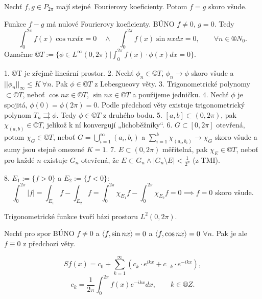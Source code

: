 \documentclass[12pt]{article}					%
\begin{document}
	\begin{veta}
		Nechť $f, g \in P_{2\pi}$ mají stejné Fourierovy koeficienty. Potom $f = g$ skoro všude.

		\begin{dukazin}
			Funkce $f - g$ má nulové Fourierovy koeficienty. BÚNO $f ≠ 0$, $g = 0$. Tedy
			$$ \int_0^{2 \pi} f(x) \cos n x dx = 0 \quad \land \quad \int_0^{2\pi} f(x) \sin n x dx = 0, \qquad \forall n \in ®N_0. $$
			Označme $©T := \{\phi \in L^∞ (0, 2\pi) | \int_0^{2\pi} f(x) · \phi(x) dx = 0\}$.

			1. ©T je zřejmě lineární prostor. 2. Nechť $\phi_n \in ©T$, $\phi_n \rightarrow \phi$ skoro všude a $||\phi_n||_∞ ≤ K\ \forall n$. Pak $\phi \in ©T$ z Lebesgueovy věty. 3. Trigonometrické polynomy $\subset ©T$, neboť $\cos n x \in ©T$, $\sin n x \in ©T$ a použijeme jedničku. 4. Nechť $\phi$ je spojitá, $\phi(0) = \phi(2\pi) = 0$. Podle předchozí věty existuje trigonometrický polynom $T_n \rightrightarrows \phi$. Tedy $\phi \in ©T$ z druhého bodu. 5. $[a, b] \subset (0, 2\pi)$, pak $\chi_{(a, b)} \in ©T$, jelikož k ní konvergují „lichoběžníky“. 6. $G \subset [0, 2\pi]$ otevřená, potom $\chi_G \in ©T$, neboť $G = \bigcup_{i=1}^∞ (a_i, b_i)$ a $\sum_{i=1}^k \chi_{(a_i, b_i)} \rightarrow \chi_G$ skoro všude a sumy jsou stejně omezené $K = 1$. 7. $E \subset (0, 2\pi)$ měřitelná, pak $\chi_E \in ©T$, neboť pro každé $n$ existuje $G_n$ otevřená, že $E \subset G_n \land |G_n \setminus E| < \frac{1}{2^n}$ (z TMI).

			8. $E_1 := \{f > 0\}$ a $E_2 := \{f < 0\}$:
			$$ \int_0^{2 \pi} |f| = \int_{E_1} f - \int_{E_2} f = \int_0^{2\pi} \chi_{E_1} f - \int_0^{2\pi} \chi_{E_2} f = 0 \implies f = 0 \text{ skoro všude}. $$
		\end{dukazin}
	\end{veta}

	\begin{dusledek}
		Trigonometrické funkce tvoří bázi prostoru $L^2(0, 2\pi)$.

		\begin{dukazin}
			Nechť pro spor BÚNO $f ≠ 0$ a $\left\langle f, \sin n x\right\rangle = 0$ a $\left\langle f, \cos n x\right\rangle = 0$ $\forall n$. Pak je ale $f ≡ 0$ z předchozí věty.
		\end{dukazin}
	\end{dusledek}

	\begin{poznamka}
		$$ S f(x) = c_0 + \sum_{k=1}^∞ (c_k ·e^{i k x} + c_{-k}·e^{-i k x}), $$
		$$ c_k = \frac{1}{2\pi} \int_0^{2\pi} f(x) e^{-i k x} dx, \qquad k \in ®Z. $$
	\end{poznamka}
\end{document}
